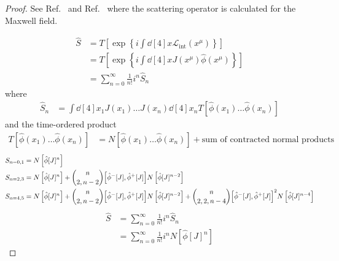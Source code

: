 \begin{proof}
	See Ref.~\cite{Zhang1999} and Ref.~\cite[p.~180]{Itzykson2012} where the scattering operator is calculated for the Maxwell field.
	
	\begin{equation*}
		\begin{split}
			\hat{S}
			&=
			T\left[
				\exp\left\{
					i
					\int\dd[4]{x}
					\mathcal{L}_\text{int}(x^\mu)
				\right\}
			\right]
			\\
			&=
			T\left[
				\exp\left\{
					i
					\int\dd[4]{x}
					J(x^\mu)
					\hat\phi(x^\mu)
				\right\}
			\right]
			\\
			&=
			\sum_{n=0}^\infty
			\frac{1}{n!}
			i^n
			\hat{S}_n
		\end{split}
	\end{equation*}
	where
	\begin{equation*}
		\begin{split}
			\hat{S}_n
			&=
			\int\dd[4]{x_1}J(x_1)\dots J(x_n)\dd[4]{x_n}
			T\left[
				\hat\phi(x_1)
				\dots
				\hat\phi(x_n)
			\right]
		\end{split}
	\end{equation*}
	and the time-ordered product
	\begin{equation*}
		\begin{split}
			T\left[
				\hat\phi(x_1)
				\dots
				\hat\phi(x_n)
			\right]
			&=
			N\left[
				\hat\phi(x_1)
				\dots
				\hat\phi(x_n)
			\right]
			+
			\text{sum of contracted normal products}			
		\end{split}
	\end{equation*}
	\begin{align*}
		S_{n=0,1}
		&=
		N\left[\hat\phi[J]^n\right]
		\\
		S_{n=2,3}
		&=
		N\left[\hat\phi[J]^n\right]
		+
		\binom{n}{2,n-2}
		\comm{\hat\phi^-[J]}{\hat\phi^+[J]}
		N\left[\hat\phi[J]^{n-2}\right]
		\\
		S_{n=4,5}
		&=
		N\left[\hat\phi[J]^n\right]
		+
		\binom{n}{2,n-2}
		\comm{\hat\phi^-[J]}{\hat\phi^+[J]}
		N\left[\hat\phi[J]^{n-2}\right]
		+
		\binom{n}{2,2,n-4}
		\comm{\hat\phi^-[J]}{\hat\phi^+[J]}^2
		N\left[\hat\phi[J]^{n-4}\right]
	\end{align*}
	\begin{equation*}
		\begin{split}
			\hat{S}
			&=
			\sum_{n=0}^\infty
			\frac{1}{n!}
			i^n
			\hat{S}_n
			\\
			&=
			\sum_{n=0}^\infty
			\frac{1}{n!}
			i^n
			N\left[\hat\phi[J]^n\right]

\end{split}
\end{equation*}
\end{proof}
